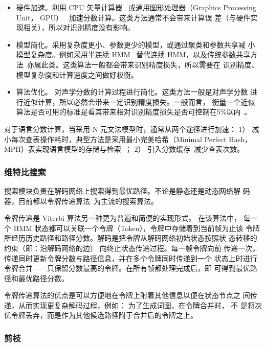 \begin{itemize}
\item 硬件加速。利用 CPU 矢量计算器~\cite{kanthak2000using}
或通用图形处理器（Graphics
Processing Unit， GPU）~\cite{chong2009fully}
加速分数计算。这类方法通常不会带来计算误
差（与硬件实现相关），所以对识别精度没有影响。
\item 模型简化。采用复杂度更小、参数更少的模型，或通过聚类和参数共享减
小模型复杂度。例如采用半连续 HMM~\cite{huang1990semi} 替代连续 HMM，以及传统参数共享方法~\cite{young2002htk}亦属此类。这类算法一般都会带来识别精度损失，所以需要在
识别精度、模型复杂度和计算速度之间做好权衡。
\item 算法优化。 对声学分数的计算过程进行简化。这类方法一般是对声学分数
进行近似计算，所以必然会带来一定识别精度损失。一般而言， 衡量一个近似
算法是否可用的标准是看其带来相对识别精度损失是否可控制在5\%以内~\cite{cai2009efficient}。
\end{itemize}

对于语言分数计算，当采用 N 元文法模型时，通常从两个途径进行加速： 1）
减小每次查表操作耗时，典型方法是采用最小完美哈希（Minimal Perfect Hash，
MPH）表实现语言模型的存储与检索~\cite{li2007fast,cardenal2002fast}； 2） 引入分数缓存~\cite{huijbregts2008fast}减少查表次数。

\subsubsection{维特比搜索}

搜索模块负责在解码网络上搜索得到最优路径。不论是静态还是动态网络解
码器，目前都以令牌传递算法~\cite{young1989token}为主流的搜索算法。

令牌传递是 Viterbi 算法另一种更为普遍和简便的实现形式。 在该算法中，
每一个 HMM 状态都可以关联一个令牌（Token），令牌中存储着到当前帧为止该
令牌所经历历史路径和路径分数。解码是把令牌从解码网络初始状态按照状
态转移的约束（即：沿解码网络的边） 向终止状态传递过程。每一帧令牌向前
传递一次，传递同时更新令牌分数与路径信息，并在多个令牌同时传递到一个
状态上时进行令牌合并——只保留分数最高的令牌。在所有帧都处理完成后，即
可得到最优路径和最优路径分数。

令牌传递算法的优点是可以方便地在令牌上附着其他信息以便在状态节点之
间传递，从而实现更复杂解码过程，例如： 为了生成词图，在令牌合并时， 不
是将次优令牌丢弃，而是作为其他候选路径附于合并后的令牌之上。

\subsubsection{剪枝}

